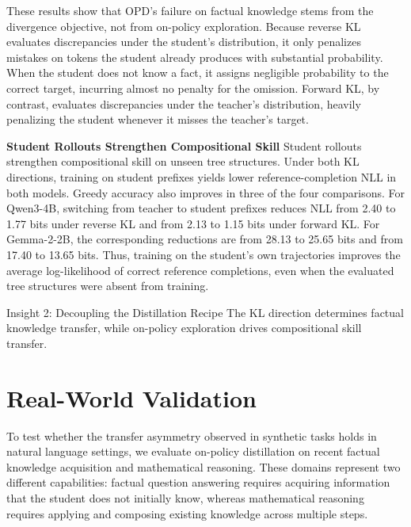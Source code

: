 \documentclass[]{template}
\theoremstyle{plain}
\theoremstyle{definition}
\theoremstyle{remark}
\renewcommand{\paragraph}[1]{\vspace{1mm}\noindent\textbf{#1}}
\begin{document}
These results show that OPD's failure on factual knowledge stems from the divergence objective, not from on-policy exploration. Because reverse KL evaluates discrepancies under the student's distribution, it only penalizes mistakes on tokens the student already produces with substantial probability. When the student does not know a fact, it assigns negligible probability to the correct target, incurring almost no penalty for the omission. Forward KL, by contrast, evaluates discrepancies under the teacher's distribution, heavily penalizing the student whenever it misses the teacher's target.

\paragraph{Student Rollouts Strengthen Compositional Skill}
Student rollouts strengthen compositional skill on unseen tree structures. Under both KL directions, training on student prefixes yields lower reference-completion NLL in both models. Greedy accuracy also improves in three of the four comparisons. For Qwen3-4B, switching from teacher to student prefixes reduces NLL from 2.40 to 1.77 bits under reverse KL and from 2.13 to 1.15 bits under forward KL. For Gemma-2-2B, the corresponding reductions are from 28.13 to 25.65 bits and from 17.40 to 13.65 bits. Thus, training on the student's own trajectories improves the average log-likelihood of correct reference completions, even when the evaluated tree structures were absent from training.

\begin{observationbox}{Insight 2: Decoupling the Distillation Recipe}
The KL direction determines factual knowledge transfer, while on-policy exploration drives compositional skill transfer.
\end{observationbox}



\section{Real-World Validation}
\label{sec:real_world}


To test whether the transfer asymmetry observed in synthetic tasks holds in natural language settings, we evaluate on-policy distillation on recent factual knowledge acquisition and mathematical reasoning. These domains represent two different capabilities: 
factual question answering requires acquiring information that the student does not initially know, whereas mathematical reasoning requires applying and composing existing knowledge across multiple steps.
\end{document}
